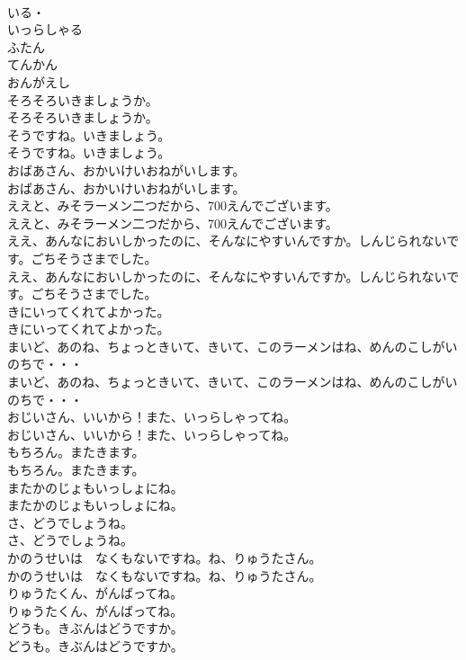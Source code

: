 \documentclass[8pt]{extreport}
\begin{document}
\begin{CJK}{UTF8}{min}
\\	いる・
\\	いっらしゃる
\\	ふたん
\\	てんかん
\\	おんがえし
\\	そろそろいきましょうか。	
\\	そろそろいきましょうか。 
\\	そうですね。いきましょう。	
\\	そうですね。いきましょう。 
\\	おばあさん、おかいけいおねがいします。	
\\	おばあさん、おかいけいおねがいします。 
\\	ええと、みそラーメン二つだから、700えんでございます。	
\\	ええと、みそラーメン二つだから、700えんでございます。 
\\	ええ、あんなにおいしかったのに、そんなにやすいんですか。しんじられないです。ごちそうさまでした。	
\\	ええ、あんなにおいしかったのに、そんなにやすいんですか。しんじられないです。ごちそうさまでした。 
\\	きにいってくれてよかった。	
\\	きにいってくれてよかった。 
\\	まいど、あのね、ちょっときいて、きいて、このラーメンはね、めんのこしがいのちで・・・	
\\	まいど、あのね、ちょっときいて、きいて、このラーメンはね、めんのこしがいのちで・・・ 
\\	おじいさん、いいから！また、いっらしゃってね。	
\\	おじいさん、いいから！また、いっらしゃってね。 
\\	もちろん。またきます。	
\\	もちろん。またきます。 
\\	またかのじょもいっしょにね。	
\\	またかのじょもいっしょにね。 
\\	さ、どうでしょうね。	
\\	さ、どうでしょうね。 
\\	かのうせいは　なくもないですね。ね、りゅうたさん。	
\\	かのうせいは　なくもないですね。ね、りゅうたさん。 
\\	りゅうたくん、がんばってね。	
\\	りゅうたくん、がんばってね。 
\\	どうも。きぶんはどうですか。	
\\	どうも。きぶんはどうですか。 

\end{CJK}
\end{document}

